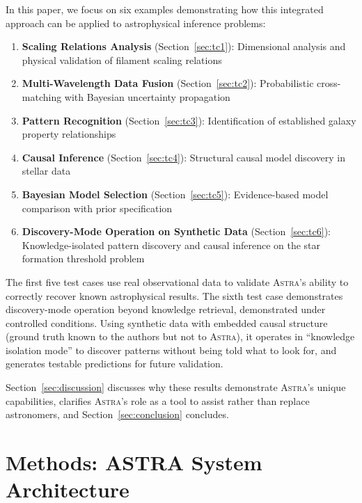 \documentclass[fleqn,usenatbib]{mnras}
\newcommand{\astra}{\textsc{Astra}\xspace}
\begin{document}
In this paper, we focus on six examples demonstrating how this integrated approach can be applied to astrophysical inference problems:
\begin{enumerate}
  \item[(i)] \textbf{Scaling Relations Analysis} (Section~\ref{sec:tc1}): Dimensional analysis and physical validation of filament scaling relations
  \item[(ii)] \textbf{Multi-Wavelength Data Fusion} (Section~\ref{sec:tc2}): Probabilistic cross-matching with Bayesian uncertainty propagation
  \item[(iii)] \textbf{Pattern Recognition} (Section~\ref{sec:tc3}): Identification of established galaxy property relationships
  \item[(iv)] \textbf{Causal Inference} (Section~\ref{sec:tc4}): Structural causal model discovery in stellar data
  \item[(v)] \textbf{Bayesian Model Selection} (Section~\ref{sec:tc5}): Evidence-based model comparison with prior specification
  \item[(vi)] \textbf{Discovery-Mode Operation on Synthetic Data} (Section~\ref{sec:tc6}): Knowledge-isolated pattern discovery and causal inference on the star formation threshold problem
\end{enumerate}

The first five test cases use real observational data to validate \astra's ability to correctly recover known astrophysical results.
The sixth test case demonstrates discovery-mode operation beyond knowledge retrieval, demonstrated under controlled conditions.
Using synthetic data with embedded causal structure (ground truth known to the authors but not to \astra), it operates in ``knowledge isolation mode'' to discover patterns without being told what to look for, and generates testable predictions for future validation.

Section~\ref{sec:discussion} discusses why these results demonstrate \astra's unique capabilities, clarifies \astra's role as a tool to assist rather than replace astronomers, and Section~\ref{sec:conclusion} concludes.

\section{Methods: ASTRA System Architecture}
\label{sec:methods}
\end{document}
